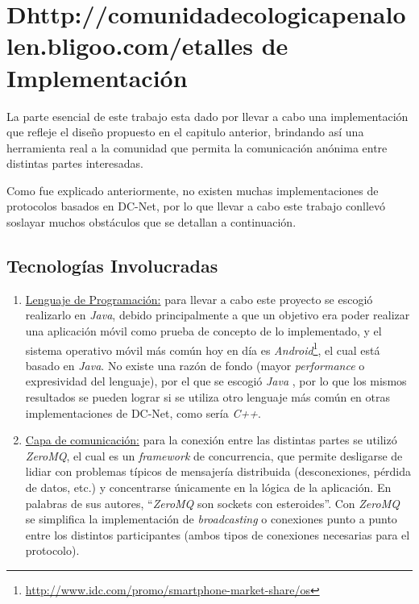 \chapter{Dhttp://comunidadecologicapenalolen.bligoo.com/etalles de Implementación}

La parte esencial de este trabajo esta dado por llevar a cabo una 
implementación que refleje el diseño propuesto en el capitulo anterior, 
brindando así una herramienta real a la comunidad que permita la comunicación 
anónima entre distintas partes interesadas.

Como fue explicado anteriormente, no existen muchas implementaciones de 
protocolos basados en DC-Net, por lo que llevar a cabo este trabajo conllevó 
soslayar muchos obstáculos que se detallan a continuación.

\section{Tecnologías Involucradas}

\begin{enumerate}
    \item \underline{Lenguaje de Programación:} para llevar a cabo este 
    proyecto se escogió realizarlo en \emph{Java}, debido principalmente a que 
    un objetivo era poder realizar una aplicación móvil como prueba de 
    concepto de lo implementado, y el sistema operativo móvil más común hoy en 
    día es \emph{Android}\footnote{\url{http://www.idc.com/promo/smartphone-market-share/os}}, el 
    cual está basado en \emph{Java}. No existe una razón de fondo (mayor \emph{
    performance} o expresividad del lenguaje), por el que se escogió \emph{Java
    }, por lo que los mismos resultados se pueden lograr si se utiliza otro 
    lenguaje más común en otras implementaciones de DC-Net, como sería \emph{
    C++}.

    \item \underline{Capa de comunicación:} para la conexión entre las 
    distintas partes se utilizó \emph{ZeroMQ}, el cual es un \emph{framework} 
    de concurrencia, que permite desligarse de lidiar con problemas típicos de 
    mensajería distribuida (desconexiones, pérdida de datos, etc.) y 
    concentrarse únicamente en la lógica de la aplicación. En palabras de sus 
    autores, ``\emph{ZeroMQ} son sockets con esteroides''. Con \emph{ZeroMQ} 
    se simplifica la implementación de \emph{broadcasting} o conexiones punto 
    a punto entre los distintos participantes (ambos tipos de conexiones 
    necesarias para el protocolo).
\end{enumerate}


